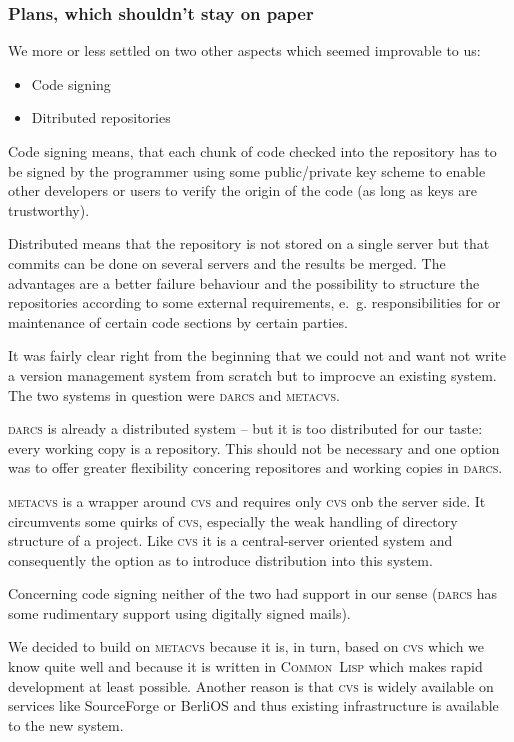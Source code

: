\documentclass[fleqn, 10pt, a4paper]{report}
\begin{document}
\subsubsection{Plans, which shouldn't stay on paper}

We more or less settled on two other aspects which seemed
improvable to us:

\begin{itemize}
\item Code signing
\item Ditributed repositories
\end{itemize}

Code signing means, that each chunk of code checked into the repository
has to be signed by the programmer using some public/private key scheme
to enable other developers or users to verify the origin of the code (as
long as keys are trustworthy).

Distributed means that the repository is not stored on a single server
but that commits can be done on several servers and the results be
merged. The advantages are a better failure behaviour and the
possibility to structure the repositories according to some external
requirements, e.~g. responsibilities for or maintenance of certain code
sections by certain parties.

It was fairly clear right from the beginning that we could not
and want not write a version management system from scratch but
to improcve an existing system. The two systems in question
were \textsc{darcs} and \textsc{metacvs}.

\textsc{darcs} is already a distributed system -- but it is 
too distributed for our taste: every working copy is a repository.
This should not be necessary and one option was to offer greater
flexibility concering repositores and working copies in
\textsc{darcs}.

\textsc{metacvs} is a wrapper around \textsc{cvs} and requires only
\textsc{cvs} onb the server side. It circumvents some quirks of
\textsc{cvs}, especially the weak handling of directory structure of a
project. Like \textsc{cvs} it is a central-server oriented system
and consequently the option as to introduce distribution into this
system.

Concerning code signing neither of the two had support in our sense
(\textsc{darcs} has some rudimentary support using digitally signed
mails).

We decided to build on \textsc{metacvs} because it is, in turn, based on
\textsc{cvs} which we know quite well and because it is written in
\textsc{Common~Lisp} which makes rapid development at least possible.
Another reason is that \textsc{cvs} is widely available on services
like SourceForge or BerliOS and thus existing infrastructure
is available to the new system.
\end{document}

